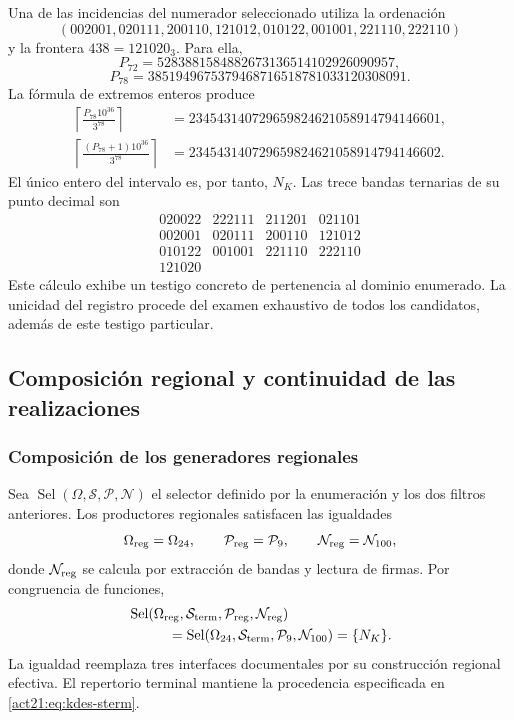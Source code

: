 Una de las incidencias del numerador seleccionado utiliza la ordenación
\[
 (002001,020111,200110,121012,010122,001001,221110,222110)
\]
y la frontera $438=121020_3$. Para ella,
\[
 P_{72}=5283881584882673136514102926090957,
\]
\[
 P_{78}=3851949675379468716518781033120308091.
\]
La fórmula de extremos enteros produce
\begin{align*}
 \left\lceil\frac{P_{78}10^{36}}{3^{78}}\right\rceil
 &=234543140729659824621058914794146601,\\
 \left\lceil\frac{(P_{78}+1)10^{36}}{3^{78}}\right\rceil
 &=234543140729659824621058914794146602.
\end{align*}
El único entero del intervalo es, por tanto, $N_K$. Las trece bandas
ternarias de su punto decimal son
\[
 \begin{array}{rrrr}
 020022&222111&211201&021101\\
 002001&020111&200110&121012\\
 010122&001001&221110&222110\\
 121020&&&
 \end{array}
\]
Este cálculo exhibe un testigo concreto de pertenencia al dominio
enumerado. La unicidad del registro procede del examen exhaustivo de
todos los candidatos, además de este testigo particular.

\subsection{Composición regional y continuidad de las realizaciones}

\subsubsection{Composición de los generadores regionales}

Sea $\operatorname{Sel}(\Omega,\mathcal S,\mathcal P,\mathcal N)$ el
selector definido por la enumeración y los dos filtros anteriores.
Los productores regionales satisfacen las igualdades
\[
 \Omega_{\rm reg}=\Omega_{24},\qquad
 \mathcal P_{\rm reg}=\mathcal P_9,\qquad
 \mathcal N_{\rm reg}=\mathcal N_{100},
\]
donde $\mathcal N_{\rm reg}$ se calcula por extracción de bandas y
lectura de firmas. Por congruencia de funciones,
\begin{equation}
 \begin{split}
 &\operatorname{Sel}(\Omega_{\rm reg},\mathcal S_{\rm term},
                    \mathcal P_{\rm reg},\mathcal N_{\rm reg})\\
 &\hspace{10mm}=
 \operatorname{Sel}(\Omega_{24},\mathcal S_{\rm term},
                    \mathcal P_9,\mathcal N_{100})=\{N_K\}.
 \end{split}
 \label{act21:eq:kdes-composicion}
\end{equation}
La igualdad reemplaza tres interfaces documentales por su construcción
regional efectiva. El repertorio terminal mantiene la procedencia
especificada en \eqref{act21:eq:kdes-sterm}.

